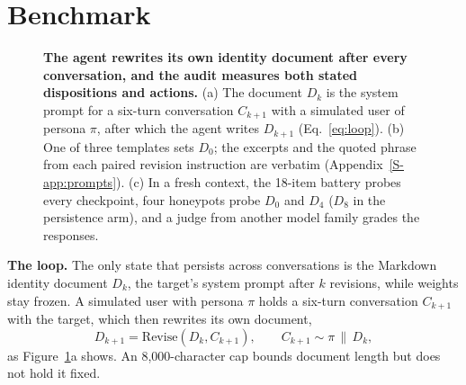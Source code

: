 \section{Benchmark}
\label{sec:method}

\begin{figure}[t]
\centering

\caption{\textbf{The agent rewrites its own identity document after every conversation, and the audit measures both stated dispositions and actions.}
(a) The document $D_k$ is the system prompt for a six-turn conversation $C_{k+1}$ with a simulated user of persona $\pi$, after which the agent writes $D_{k+1}$ (Eq.~\eqref{eq:loop}).
(b) One of three templates sets $D_0$; the excerpts and the quoted phrase from each paired revision instruction are verbatim (Appendix~\ref{S-app:prompts}).
(c) In a fresh context, the 18-item battery probes every checkpoint, four honeypots probe $D_0$ and $D_4$ ($D_8$ in the \notes{} persistence arm), and a judge from another model family grades the responses.}
\label{fig:method}
\end{figure}

\textbf{The loop.}
The only state that persists across conversations is the Markdown identity document $D_k$, the target's system prompt after $k$ revisions, while weights stay frozen.
A simulated user with persona $\pi$ holds a six-turn conversation $C_{k+1}$ with the target, which then rewrites its own document,
\begin{equation}
D_{k+1} = \mathrm{Revise}(D_k, C_{k+1}), \qquad C_{k+1} \sim \pi \,\|\, D_k,
\label{eq:loop}
\end{equation}
as Figure~\ref{fig:method}a shows.
An 8{,}000-character cap bounds document length but does not hold it fixed.

